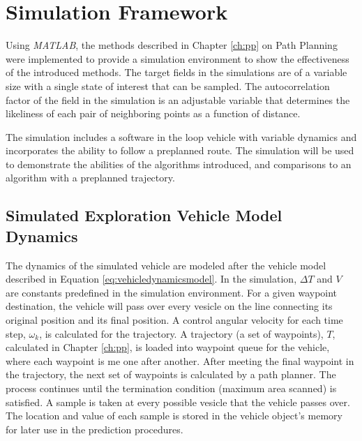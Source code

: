 \chapter{Simulation Framework}
Using \textit{MATLAB}, the methods described in Chapter \ref{ch:pp} on Path Planning were implemented to provide a simulation environment to show the effectiveness of the introduced methods. The target fields in the simulations are of a variable size with a single state of interest that can be sampled. The autocorrelation factor of the field in the simulation is an adjustable variable that determines the likeliness of each pair of neighboring points as a function of distance. 

The simulation includes a software in the loop vehicle with variable dynamics and incorporates the ability to follow a preplanned route. The simulation will be used to demonstrate the abilities of the algorithms introduced, and comparisons to an algorithm with a preplanned trajectory. 

\section{Simulated Exploration Vehicle Model Dynamics}
The dynamics of the simulated vehicle are modeled after the vehicle model described in Equation \ref{eq:vehicledynamicsmodel}. In the simulation, $\Delta T$ and $V$ are constants predefined in the simulation environment. For a given waypoint destination, the vehicle will pass over every vesicle on the line connecting its original position and its final position. A control angular velocity for each time step, $\omega_k$, is calculated for the trajectory. A trajectory (a set of waypoints), $T$, calculated in Chapter \ref{ch:pp}, is loaded into waypoint queue for the vehicle, where each waypoint is me one after another. After meeting the final waypoint in the trajectory, the next set of waypoints is calculated by a path planner. The process continues until the termination condition (maximum area scanned) is satisfied. A sample is taken at every possible vesicle that the vehicle passes over. The location and value of each sample is stored in the vehicle object's memory for later use in the prediction procedures.



